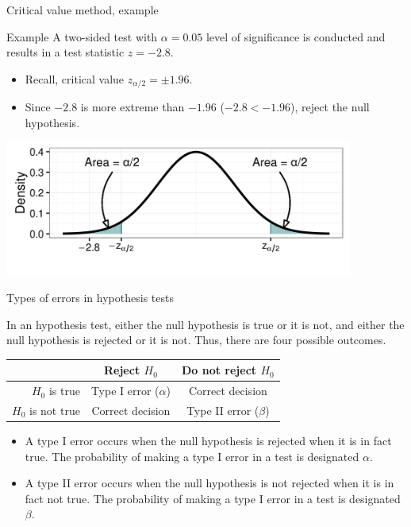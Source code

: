 \documentclass[xcolor=table, handout]{beamer}
\begin{document}
\begin{frame}{Critical value method, example}
\begin{exampleblock}{Example}
\large
A two-sided test with $\alpha = 0.05$ level of significance is conducted and results in a test statistic $z= - 2.8$.
\begin{itemize}
\item Recall, critical value $z_{\alpha/2} = \pm 1.96$.
\item Since $-2.8$ is more extreme than $-1.96$ ($-2.8 < -1.96$), reject the null hypothesis.
\end{itemize} 
\end{exampleblock}

\medskip
{\centering
\includegraphics[width=4.5in]{../images/ch08_cv}
\par}

\end{frame}

\begin{frame}{Types of errors in hypothesis tests}
\begin{block}{}
\large
In an hypothesis test, either the null hypothesis is true or it is not, and either the null hypothesis is rejected or it is not. Thus, there are four possible outcomes.\\
\medskip
{\centering
\tabspacemed
\begin{tabular}{ r | c | c}
& Reject $H_0$ & Do not reject $H_0$\\
\hline
$H_0$ is true & Type I error ($\alpha$) & Correct decision\\
\hline
$H_0$ is not true & Correct decision & Type II error ($\beta$)
\end{tabular}
\tabspacedef
\par}
\medskip
\begin{itemize}
\pause\item A type I error occurs when the null hypothesis is rejected when it is in fact true. The probability of making a type I error in a test is designated $\alpha$.
\pause\item A type II error occurs when the null hypothesis is not rejected when it is in fact not true. The probability of making a type I error in a test is designated $\beta$.
\end{itemize}
\end{block}
\end{frame}
\end{document}
